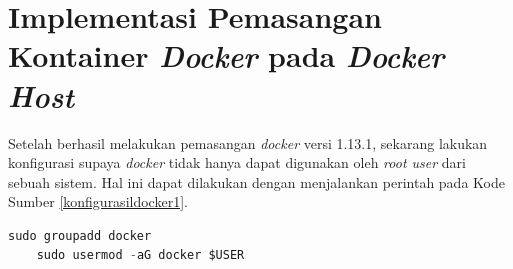   \section{Implementasi Pemasangan Kontainer \textit{Docker} pada \textit{Docker Host}}
  Setelah berhasil melakukan pemasangan \textit{docker} versi 1.13.1, sekarang lakukan konfigurasi supaya \textit{docker} tidak hanya dapat digunakan oleh \textit{root user} dari sebuah sistem. Hal ini dapat dilakukan dengan menjalankan perintah pada Kode Sumber \ref{konfigurasildocker1}.
  \newline
    \begin{minipage}{\linewidth}
	\begin{lstlisting}[caption=Perintah untuk installasi Ansible,language=Python,label=konfigurasildocker1]
	sudo groupadd docker
	sudo usermod -aG docker $USER
	\end{lstlisting}
	\end{minipage}
	
